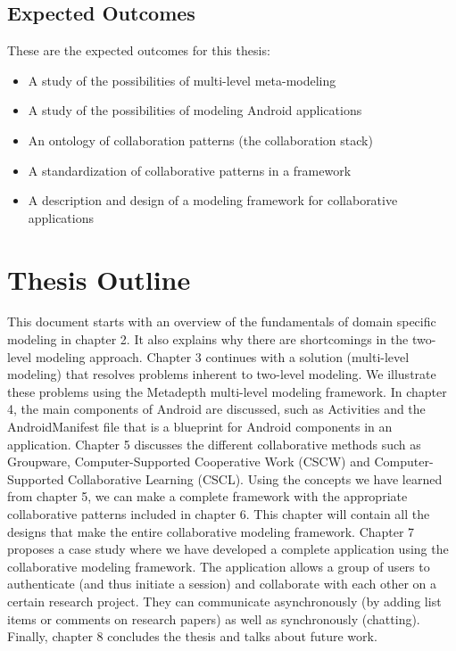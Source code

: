 \subsection{Expected Outcomes}

These are the expected outcomes for this thesis:

\begin{itemize}
\item{A study of the possibilities of multi-level meta-modeling}
\item{A study of the possibilities of modeling Android applications}
\item{An ontology of collaboration patterns (the collaboration stack)}
\item{A standardization of collaborative patterns in a framework}
\item{A description and design of a modeling framework for collaborative applications}
\end{itemize}

\section{Thesis Outline}

This document starts with an overview of the fundamentals of domain specific modeling in chapter 2. It also explains why there are shortcomings in the two-level modeling approach. Chapter 3 continues with a solution (multi-level modeling) that resolves problems inherent to two-level modeling. We illustrate these problems using the Metadepth multi-level modeling framework. In chapter 4, the main components of Android are discussed, such as Activities and the AndroidManifest file that is a blueprint for Android components in an application. Chapter 5 discusses the different collaborative methods such as Groupware, Computer-Supported Cooperative Work (CSCW) and Computer-Supported Collaborative Learning (CSCL). Using the concepts we have learned from chapter 5, we can make a complete framework with the appropriate collaborative patterns included in chapter 6. This chapter will contain all the designs that make the entire collaborative modeling framework. Chapter 7 proposes a case study where we have developed a complete application using the collaborative modeling framework. The application allows a group of users to authenticate (and thus initiate a session) and collaborate with each other on a certain research project. They can communicate asynchronously (by adding list items or comments on research papers) as well as synchronously (chatting). Finally, chapter 8 concludes the thesis and talks about future work.
